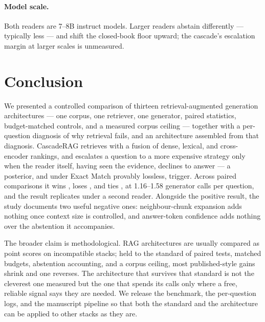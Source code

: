 \paragraph{Model scale.} Both readers are 7--8B instruct models. Larger
readers abstain differently --- typically less --- and shift the
closed-book floor upward; the cascade's escalation margin at larger
scales is unmeasured.

\section{Conclusion}
\label{sec:conclusion}

We presented a controlled comparison of thirteen retrieval-augmented
generation architectures --- one corpus, one retriever, one generator,
paired statistics, budget-matched controls, and a measured corpus ceiling
--- together with a per-question diagnosis of why retrieval fails, and an
architecture assembled from that diagnosis. CascadeRAG retrieves with a
fusion of dense, lexical, and cross-encoder rankings, and escalates a
question to a more expensive strategy only when the reader itself, having
seen the evidence, declines to answer --- a posterior, and under Exact
Match provably lossless, trigger. Across \ResultPairs{} paired
comparisons it wins \ResultWins{}, loses \ResultLosses{}, and ties
\ResultTies{}, at 1.16--1.58 generator calls per question, and the result
replicates under a second reader. Alongside the positive result, the
study documents two useful negative ones: neighbour-chunk expansion adds
nothing once context size is controlled, and answer-token confidence adds
nothing over the abstention it accompanies.

The broader claim is methodological. RAG architectures are usually
compared as point scores on incompatible stacks; held to the standard of
paired tests, matched budgets, abstention accounting, and a corpus
ceiling, most published-style gains shrink and one reverses. The
architecture that survives that standard is not the cleverest one
measured but the one that spends its calls only where a free, reliable
signal says they are needed. We release the benchmark, the per-question
logs, and the manuscript pipeline so that both the standard and the
architecture can be applied to other stacks as they are.
